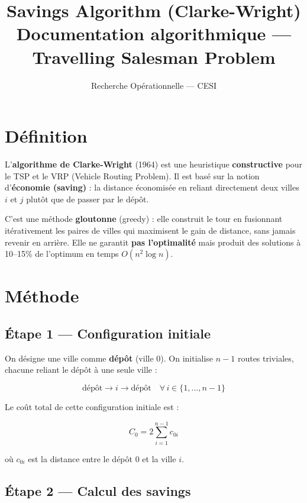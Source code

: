 \documentclass[12pt, a4paper]{article}
\title{
  \textbf{Savings Algorithm (Clarke-Wright)}\\
  \large Documentation algorithmique --- Travelling Salesman Problem
}
\author{Recherche Opérationnelle --- CESI}
\date{}
\begin{document}
\maketitle
\tableofcontents
\newpage

\section{Définition}

L'\textbf{algorithme de Clarke-Wright} (1964) est une heuristique \textbf{constructive}
pour le TSP et le VRP (Vehicle Routing Problem). Il est basé sur la notion
d'\textbf{économie (saving)} : la distance économisée en reliant directement
deux villes $i$ et $j$ plutôt que de passer par le dépôt.

C'est une méthode \textbf{gloutonne} (greedy) : elle construit le tour en fusionnant
itérativement les paires de villes qui maximisent le gain de distance, sans jamais
revenir en arrière. Elle ne garantit \textbf{pas l'optimalité} mais produit des
solutions à 10--15\% de l'optimum en temps $O(n^2 \log n)$.

\section{Méthode}

\subsection{Étape 1 --- Configuration initiale}

On désigne une ville comme \textbf{dépôt} (ville $0$). On initialise $n-1$ routes
triviales, chacune reliant le dépôt à une seule ville :

\begin{equation}
  \text{dépôt} \to i \to \text{dépôt} \quad \forall\, i \in \{1, \ldots, n-1\}
\end{equation}

Le coût total de cette configuration initiale est :

\begin{equation}
  C_0 = 2 \sum_{i=1}^{n-1} c_{0i}
\end{equation}

où $c_{0i}$ est la distance entre le dépôt $0$ et la ville $i$.

\subsection{Étape 2 --- Calcul des savings}
\end{document}
